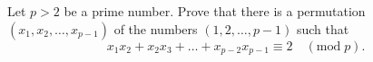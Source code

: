 \documentclass{article}
\begin{document}
\setlength{\parindent}{0pt}
Let $p > 2$ be a prime number. Prove that there is a permutation $(x_1, x_2, \dots, x_{p - 1})$ of the numbers $(1, 2, \dots, p - 1)$ such that
\[x_1x_2 + x_2x_3 + \dots + x_{p - 2}x_{p - 1} \equiv 2\quad (\text{mod}\;p).\]
\end{document}
